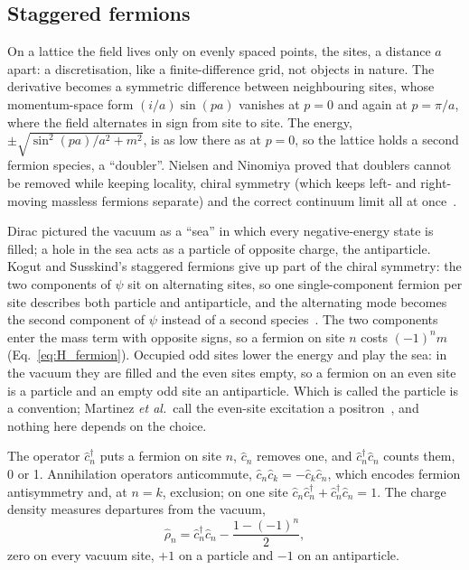 \subsection{Staggered fermions}
\label{sec:staggered}

On a lattice the field lives only on evenly spaced points, the sites, a
distance $a$ apart: a discretisation, like a finite-difference grid, not objects
in nature. The derivative becomes a symmetric difference between neighbouring
sites, whose momentum-space form $(i/a)\sin(pa)$ vanishes at
$p = 0$ and again at $p = \pi/a$, where the field alternates in sign from site
to site. The energy, $\pm\sqrt{\sin^2(pa)/a^2 + m^2}$, is as low there as at
$p = 0$, so the lattice holds a second fermion species, a ``doubler''. Nielsen and Ninomiya proved
that doublers cannot be removed while keeping locality, chiral symmetry (which
keeps left- and right-moving massless fermions separate) and the correct
continuum limit all at once~\cite{nielsen1981}.

Dirac pictured the vacuum as a ``sea'' in which every negative-energy state is
filled; a hole in the sea acts as a particle of opposite charge, the
antiparticle. Kogut and Susskind's staggered fermions give up part of the
chiral symmetry: the two components of $\psi$ sit on alternating sites, so one
single-component fermion per site describes both particle and antiparticle,
and the alternating mode becomes the second component of $\psi$ instead of a
second species~\cite{kogut1975}. The two components enter the mass term with
opposite signs, so a fermion on site $n$ costs $(-1)^n m$
(Eq.~\eqref{eq:H_fermion}). Occupied odd sites lower the energy and play the
sea: in the vacuum they are filled and the even sites empty, so a fermion on an
even site is a particle and an empty odd site an antiparticle. Which is called
the particle is a convention; Martinez \emph{et al.}\ call the even-site
excitation a positron~\cite{martinez2016}, and nothing here depends on the
choice.

The operator $\hat c^\dagger_n$ puts a fermion on site $n$, $\hat c_n$ removes
one, and $\hat c^\dagger_n \hat c_n$ counts them, 0 or 1. Annihilation
operators anticommute, $\hat c_n \hat c_k = -\hat c_k \hat c_n$, which encodes
fermion antisymmetry and, at $n = k$, exclusion; on one site
$\hat c_n\hat c^\dagger_n + \hat c^\dagger_n\hat c_n = 1$. The charge density measures departures from the
vacuum,
\begin{equation}
  \label{eq:charge}
  \hat\rho_n = \hat c^\dagger_n \hat c_n - \frac{1 - (-1)^n}{2},
\end{equation}
zero on every vacuum site, $+1$ on a particle and $-1$ on an antiparticle.

